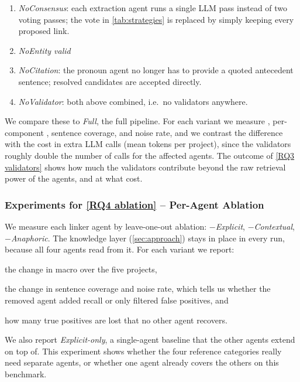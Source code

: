 \begin{enumerate}[leftmargin=*] 
\item \emph{NoConsensus}: %
each extraction agent runs a single \ac{LLM} pass instead of two voting passes;
the vote in \autoref{tab:strategies} is replaced by simply keeping every
proposed link. 

\item \emph{NoEntity valid}

\item \emph{NoCitation}: the pronoun agent no longer has to provide a quoted antecedent sentence; resolved candidates are accepted directly.

\item \emph{NoValidator}: both above combined, i.e.\ no validators anywhere.
\end{enumerate} 

We compare these to \emph{Full}, the full \approach{} pipeline. 
For each variant we measure \fone, per-component \fone, sentence coverage, and 
noise rate, and we contrast the difference with the cost in extra \ac{LLM} calls 
(mean tokens per project), since the validators roughly double the number of 
calls for the affected agents. 
The outcome of \ref{RQ3 validators} shows how much the validators contribute beyond the raw retrieval power of the agents, and
at what cost.

\subsubsection{Experiments for \ref{RQ4 ablation} -- Per-Agent Ablation}
\label{sec:exp:rq4}

We measure each linker agent by leave-one-out ablation: \emph{$-$Explicit},
\emph{$-$Contextual}, \emph{$-$Anaphoric}. 
The knowledge layer (\autoref{sec:approach}) stays in place in every run, because all four
agents read from it. 
For each variant we report:
\begin{enumerate*}[label=(\roman*)] \item the change in macro \fone over the
five projects, \item the change in sentence coverage and noise rate, which tells
us whether the removed agent added recall or only filtered false positives, and
\item how many true positives are lost that no other agent recovers.
\end{enumerate*} We also report \emph{Explicit-only}, a single-agent baseline
that the other agents extend on top of. This experiment shows whether the four
reference categories really need separate agents, or whether one agent already
covers the others on this benchmark.

